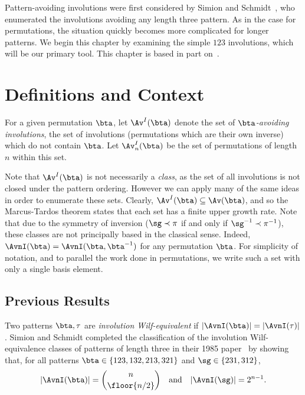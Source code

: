 \documentclass[12pt,twoside]{memoir}
\begin{document}
    Pattern-avoiding involutions were first considered by Simion and
    Schmidt~\cite{Simion1985}, who enumerated the involutions avoiding any length 
    three pattern. As in the case for permutations, the situation quickly becomes
    more complicated for longer patterns. 
    We begin this chapter by examining the simple $123$
    involutions, which will be our primary tool. This chapter is based in part
    on~\cite{me-involutions}. 
    



    
    

  \section{Definitions and Context}
  \label{involutions:sec:intro}

    \begin{definition}\label{involutions:def:invclass}
      For a given permutation $\bta$, let $\Av^I(\bta)$ denote the set of
      \emph{$\bta$-avoiding involutions}, the set of involutions (permutations
      which are their own inverse) which do not contain $\bta$. 
      Let $\Av_n^I (\bta)$ be the set of permutations of length $n$ within this set. 
    \end{definition}

    Note that $\Av^I(\bta)$ is not necessarily a \emph{class}, as the set of all
    involutions is not closed under the pattern ordering. However we can apply
    many of the same ideas in order to enumerate these sets.  Clearly, $\Av^I
    (\bta) \subseteq \Av(\bta)$, and so the Marcus-Tardos theorem states that
    each set has a finite upper growth rate. Note that due to the symmetry of
    inversion ($\sg \prec \pi$ if and only if $\sg^{-1} \prec \pi^{-1}$), these
    classes are not principally based in the classical sense. Indeed,
    $\AvnI(\bta) = \AvnI(\bta, \bta^{-1})$ for any permutation $\bta$. For
    simplicity of notation, and to parallel the work done in permutations, we
    write such a set with only a single basis element. 

    \subsection{Previous Results}

      Two patterns $\bta, \tau$ are \emph{involution Wilf-equivalent} if
      $|\AvnI(\bta)| = |\AvnI(\tau)|$. 
      Simion and Schmidt completed the classification of the involution
      Wilf-equivalence classes of patterns of length three in their 1985
      paper~\cite{Simion1985} by showing that, for all patterns $\bta \in
      \{123,132,213,321\}$ and $\sg \in \{231, 312\}$,  
      $$ | \AvnI(\bta)| = \binom{n}{\floor{n/2}} \quad 
            \text{and} \quad |\AvnI(\sg) | = 2^{n-1}.$$
\end{document}
